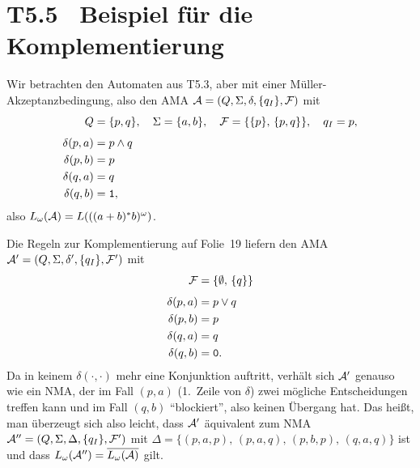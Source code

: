 \documentclass[fontsize=11pt, twoside=false, numbers=autoenddot]{scrbook}
\begin{document}
{
}

\goodbreak
\section*{T5.5~ Beispiel für die Komplementierung}

Wir betrachten den Automaten aus T5.3, aber mit einer Müller-Akzeptanzbedingung,
also den AMA $\mathcal{A} = (Q,\Sigma,\delta,\{q_I\},\mathcal{F})$ mit
%
\begin{align*}
  Q & = \{p,q\},\quad \Sigma = \{a,b\},\quad \mathcal{F} = \{\{p\},\,\{p,q\}\},\quad q_I = p,\\[4pt]
  \delta(p,a) & = p \land q   \\
  \delta(p,b) & = p           \\
  \delta(q,a) & = q           \\
  \delta(q,b) & = \texttt{1},
\end{align*}
%
also $L_\omega(\mathcal{A}) = L(((a+b)^*b)^\omega)$.

Die Regeln zur Komplementierung auf Folie~19 liefern den AMA
$\mathcal{A}' = (Q,\Sigma,\delta',\{q_I\},\mathcal{F}')$ mit
%
\begin{align*}
  \mathcal{F} & = \{\emptyset,\,\{q\}\}\\[4pt]
  \delta(p,a) & = p \lor q   \\
  \delta(p,b) & = p           \\
  \delta(q,a) & = q           \\
  \delta(q,b) & = \texttt{0}.
\end{align*}
%
Da in keinem $\delta(\cdot,\cdot)$ mehr eine Konjunktion auftritt,
verhält sich $\mathcal{A}'$ genauso wie ein NMA, der im Fall $(p,a)$ (1.~Zeile von $\delta$) zwei mögliche
Entscheidungen treffen kann und im Fall $(q,b)$ "`blockiert"', also keinen Übergang hat.
Das heißt, man überzeugt sich also leicht, dass $\mathcal{A}'$ äquivalent zum NMA
$\mathcal{A}'' = (Q,\Sigma,\Delta,\{q_I\},\mathcal{F}')$ mit
$\Delta = \{(p,a,p),\,(p,a,q),\,(p,b,p),\,(q,a,q)\}$ ist
und dass $L_\omega(\mathcal{A}'') = \overline{L_\omega(\mathcal{A})}$ gilt.
\end{document}
